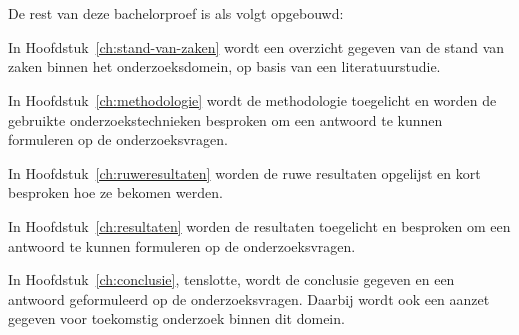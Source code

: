 \section{}%
\label{sec:opzet-bachelorproef}


De rest van deze bachelorproef is als volgt opgebouwd:

In Hoofdstuk~\ref{ch:stand-van-zaken} wordt een overzicht gegeven van de stand van zaken binnen het onderzoeksdomein, op basis van een literatuurstudie.

In Hoofdstuk~\ref{ch:methodologie} wordt de methodologie toegelicht en worden de gebruikte onderzoekstechnieken besproken om een antwoord te kunnen formuleren op de onderzoeksvragen.

In Hoofdstuk~\ref{ch:ruweresultaten} worden de ruwe resultaten opgelijst en kort besproken hoe ze bekomen werden.

In Hoofdstuk~\ref{ch:resultaten} worden de resultaten toegelicht en besproken om een antwoord te kunnen formuleren op de onderzoeksvragen.

In Hoofdstuk~\ref{ch:conclusie}, tenslotte, wordt de conclusie gegeven en een antwoord geformuleerd op de onderzoeksvragen. Daarbij wordt ook een aanzet gegeven voor toekomstig onderzoek binnen dit domein.
